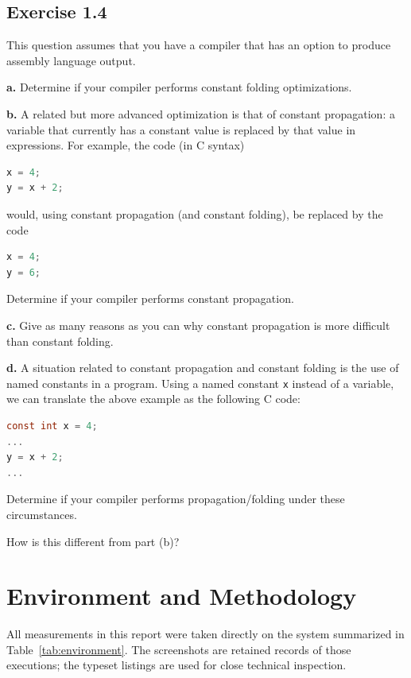 \documentclass[11pt]{article}
\newcommand{\code}[1]{\texttt{#1}}
\begin{document}
\subsection{Exercise 1.4}

This question assumes that you have a compiler that has an option to produce
assembly language output.

\medskip
\noindent\textbf{a.} Determine if your compiler performs constant folding
optimizations.

\medskip
\noindent\textbf{b.} A related but more advanced optimization is that of
constant propagation: a variable that currently has a constant value is
replaced by that value in expressions. For example, the code (in C syntax)

\begin{lstlisting}[language=C,numbers=none]
x = 4;
y = x + 2;
\end{lstlisting}

would, using constant propagation (and constant folding), be replaced by the
code

\begin{lstlisting}[language=C,numbers=none]
x = 4;
y = 6;
\end{lstlisting}

Determine if your compiler performs constant propagation.

\medskip
\noindent\textbf{c.} Give as many reasons as you can why constant propagation
is more difficult than constant folding.

\medskip
\noindent\textbf{d.} A situation related to constant propagation and constant
folding is the use of named constants in a program. Using a named constant
\code{x} instead of a variable, we can translate the above example as the
following C code:

\begin{lstlisting}[language=C,numbers=none]
const int x = 4;
...
y = x + 2;
...
\end{lstlisting}

Determine if your compiler performs propagation/folding under these
circumstances.

How is this different from part (b)?

\clearpage
\section{Environment and Methodology}

All measurements in this report were taken directly on the system summarized
in Table~\ref{tab:environment}. The screenshots are retained records of those
executions; the typeset listings are used for close technical inspection.
\end{document}
